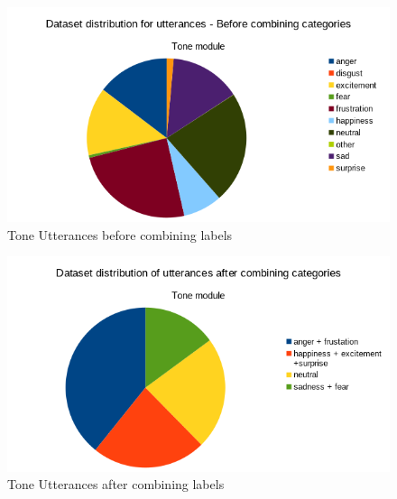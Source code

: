 \documentclass[oneside,a4paper,12pt]{report}
\begin{document}
\begin{normalsize}
\begin{itemize}
		\begin{center}
			\begin{figure}[!htbp]
				\centering
				\includegraphics[width=\textwidth]{tone-utterances-before-combining.png}
				\caption{Tone Utterances before combining labels}
				\label{fig:tone_utter_before}
			\end{figure}
		\end{center}  
		\vspace{5mm}
		\begin{center}
			\begin{figure}[!htbp]
				\centering
				\includegraphics[width=\textwidth]{tone-utterances-after-combining.png}
				\caption{Tone Utterances after combining labels}
				\label{fig:tone_utter_after}
			\end{figure}
		\end{center}
	

\end{itemize}
\end{normalsize}
\end{document}
